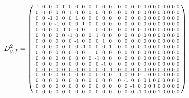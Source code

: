 \documentclass[pdftex,a4paper,parskip,listof=totoc,bibliography=totoc,onehalfspacing,12pt]{scrreprt}
\newcommand*\dashline{\hspace{-0.3em}\rotatebox[origin=c]{90}{\scalebox{-0.3}[1]{$-~~-$}}\hspace{-0.3em}}
\begin{document}
\begin{align*}
	D_{y,f}^2 &= \begin{psmallmatrix}
\text{-}1 & 0 & 0 & 0 & 1 & 0 & 0 & 0 & 0 & 0 & 0 & 0 &\dashline& 0 & 0 & 0 & 0 & 0 & 0 & 0 & 0 & 0 & 0 & 0 & 0 \\
0 & \text{-}1 & 0 & 0 & 0 & 1 & 0 & 0 & 0 & 0 & 0 & 0 &\dashline& 0 & 0 & 0 & 0 & 0 & 0 & 0 & 0 & 0 & 0 & 0 & 0 \\
0 & 0 & \text{-}1 & 0 & 0 & 0 & 1 & 0 & 0 & 0 & 0 & 0 &\dashline& 0 & 0 & 0 & 0 & 0 & 0 & 0 & 0 & 0 & 0 & 0 & 0 \\
0 & 0 & 0 & \text{-}1 & 0 & 0 & 0 & 1 & 0 & 0 & 0 & 0 &\dashline& 0 & 0 & 0 & 0 & 0 & 0 & 0 & 0 & 0 & 0 & 0 & 0 \\
0 & 0 & 0 & 0 & \text{-}1 & 0 & 0 & 0 & 1 & 0 & 0 & 0 &\dashline& 0 & 0 & 0 & 0 & 0 & 0 & 0 & 0 & 0 & 0 & 0 & 0 \\
0 & 0 & 0 & 0 & 0 & \text{-}1 & 0 & 0 & 0 & 1 & 0 & 0 &\dashline& 0 & 0 & 0 & 0 & 0 & 0 & 0 & 0 & 0 & 0 & 0 & 0 \\
0 & 0 & 0 & 0 & 0 & 0 & \text{-}1 & 0 & 0 & 0 & 1 & 0 &\dashline& 0 & 0 & 0 & 0 & 0 & 0 & 0 & 0 & 0 & 0 & 0 & 0 \\
0 & 0 & 0 & 0 & 0 & 0 & 0 & \text{-}1 & 0 & 0 & 0 & 1 &\dashline& 0 & 0 & 0 & 0 & 0 & 0 & 0 & 0 & 0 & 0 & 0 & 0 \\
0 & 0 & 0 & 0 & 0 & 0 & 0 & 0 & \text{-}1 & 0 & 0 & 0 &\dashline& 0 & 0 & 0 & 0 & 0 & 0 & 0 & 0 & 0 & 0 & 0 & 0 \\
0 & 0 & 0 & 0 & 0 & 0 & 0 & 0 & 0 & \text{-}1 & 0 & 0 &\dashline& 0 & 0 & 0 & 0 & 0 & 0 & 0 & 0 & 0 & 0 & 0 & 0 \\
0 & 0 & 0 & 0 & 0 & 0 & 0 & 0 & 0 & 0 & \text{-}1 & 0 &\dashline& 0 & 0 & 0 & 0 & 0 & 0 & 0 & 0 & 0 & 0 & 0 & 0 \\
0 & 0 & 0 & 0 & 0 & 0 & 0 & 0 & 0 & 0 & 0 & \text{-}1 &\dashline& 0 & 0 & 0 & 0 & 0 & 0 & 0 & 0 & 0 & 0 & 0 & 0 \\\hline
0 & 0 & 0 & 0 & 0 & 0 & 0 & 0 & 0 & 0 & 0 & 0 &\dashline& \text{-}1 & 0 & 0 & 0 & 1 & 0 & 0 & 0 & 0 & 0 & 0 & 0 \\
0 & 0 & 0 & 0 & 0 & 0 & 0 & 0 & 0 & 0 & 0 & 0 &\dashline& 0 & \text{-}1 & 0 & 0 & 0 & 1 & 0 & 0 & 0 & 0 & 0 & 0 \\
0 & 0 & 0 & 0 & 0 & 0 & 0 & 0 & 0 & 0 & 0 & 0 &\dashline& 0 & 0 & \text{-}1 & 0 & 0 & 0 & 1 & 0 & 0 & 0 & 0 & 0 \\
0 & 0 & 0 & 0 & 0 & 0 & 0 & 0 & 0 & 0 & 0 & 0 &\dashline& 0 & 0 & 0 & \text{-}1 & 0 & 0 & 0 & 1 & 0 & 0 & 0 & 0 \\

\end{psmallmatrix}
\end{align*}
\end{document}
